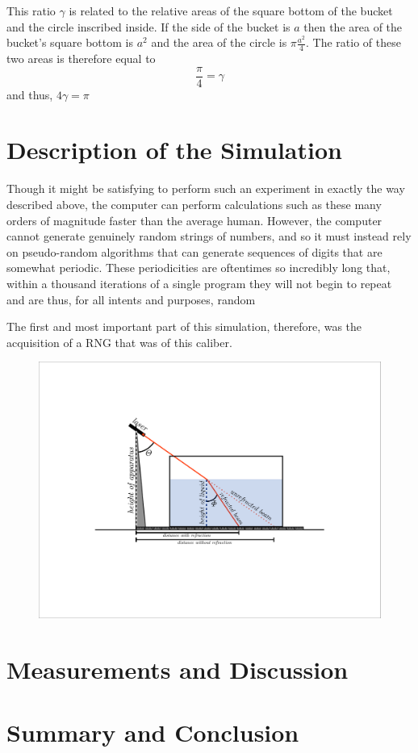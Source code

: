 \documentclass[twocolumn,prb,amsmath,amssymb,amsfonts]{revtex4}
\begin{document}
This ratio $\gamma$ is related to the relative areas of the square bottom of the bucket and the circle inscribed inside. If the side of the bucket is $a$ then the area of the bucket's square bottom is $a^2$ and the area of the circle is $\pi\frac{a^2}{4}$. The ratio of these two areas is therefore equal to
\begin{equation}
\frac{\pi}{4} = \gamma
\end{equation}
and thus, $4\gamma = \pi$

\section{Description of the Simulation}
Though it might be satisfying to perform such an experiment in exactly the way described above, the computer can perform calculations such as these many orders of magnitude faster than the average human. However, the computer cannot generate genuinely random strings of numbers, and so it must instead rely on pseudo-random algorithms that can generate sequences of digits that are somewhat periodic. These periodicities are oftentimes so incredibly long that, within a thousand iterations of a single program they will not begin to repeat and are thus, for all intents and purposes, random

The first and most important part of this simulation, therefore, was the acquisition of a RNG that was of this caliber. 
\begin{figure}
\includegraphics*[width=6.9 in]{optickslab1fig1.pdf}
\caption{}
\end{figure}


\section{Measurements and Discussion}


\section{Summary and Conclusion}
\end{document}
